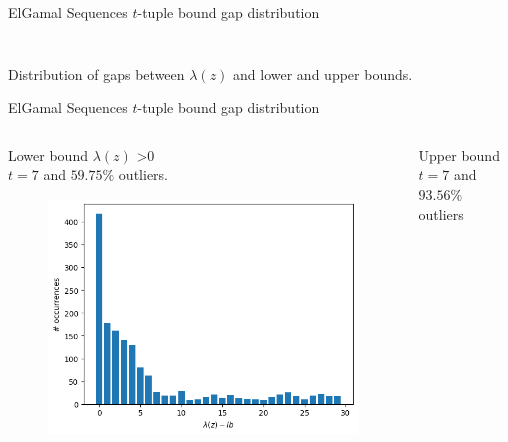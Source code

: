 \begin{frame}{ElGamal Sequences $t$-tuple bound gap distribution}
\begin{columns}
\begin{column}{0.45\textwidth}
\begin{figure}
            \end{figure}
        \end{column}
    \end{columns}
    \begin{center}
                Distribution of gaps between $\lambda(z)$ and lower and upper bounds.
    \end{center}
\end{frame}


\begin{frame}{ElGamal Sequences $t$-tuple bound gap distribution}
    \begin{columns}
        \begin{column}{0.45\textwidth}
        \begin{center}
            Lower bound $\lambda(z)$ >0\\
            $t =7$ and $59.75\%$ outliers.
        \end{center}
            \begin{figure}
                \centering
                \includegraphics[width=\textwidth]{figures/LB0t7with5975outliers.png}
            \end{figure}
        \end{column}
        \begin{column}{0.45\textwidth}
        \begin{center}
            Upper bound \\
            $t = 7$ and $93.56\%$ outliers
        \end{center}
            \begin{figure}

\end{figure}
\end{column}
\end{columns}
\end{frame}
